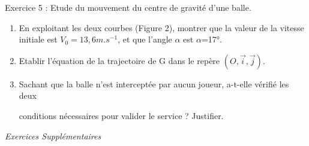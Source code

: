 \documentclass[12pt, french]{article}
\begin{document}
\begin{Box2}{Exercice 5 : Etude du mouvement du centre de gravité d’une balle. }
\begin{enumerate}
\item  En exploitant les deux courbes (Figure 2),
montrer que la valeur de la vitesse initiale
est $V_0 = 13,6 m.s^{-1}$, et que l’angle $\alpha$ est
$\alpha$=17°.

\item Etablir l’équation de la trajectoire de G
	dans le repère $(O,\vec{i}, \vec{j})$.
\item Sachant que la balle n’est interceptée par
aucun joueur, a-t-elle vérifié les deux

conditions nécessaires pour valider le
service ? Justifier.
\end{enumerate}



\end{Box2}


\begin{center}
   \Large{ \em{Exercices Supplémentaires}}
\end{center}

\end{document}

